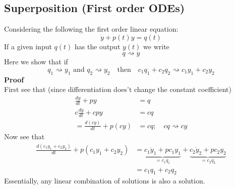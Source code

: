 \documentclass{report}
\begin{document}
\subsection{Superposition (First order ODEs)}%
Considering the following the first order linear equation:
\begin{equation*}
\dot{y}+p(t)y=q(t)
\end{equation*}
If a given input $q(t)$ has the output $y(t)$ we write
\begin{equation*}
q\rightsquigarrow y
\end{equation*}
Here we show that if
\begin{equation*}
q_1\rightsquigarrow y_1\text{ and }q_2\rightsquigarrow y_2
\quad\text{then}\quad c_1q_1+c_2q_2\rightsquigarrow
c_1y_1+c_2y_2
\end{equation*}
\textbf{Proof}\\
First see that (since differentiation does't change the constant coefficient)
\begin{align*}
\frac{dy}{dt}+py&=q\\
c\frac{dy}{dt}+cpy&=cq\\
=\frac{d(cy)}{dt}+p(cy)&=cq;\quad cq\rightsquigarrow cy
\end{align*}
Now see that
\begin{align*}
\frac{d(c_1y_1+c_2y_2)}{dt}+p(c_1y_1+c_2y_2)
&=\underbrace{c_1\dot{y}_1+pc_1y_1}_{=c_1q_1}
+\underbrace{c_2\dot{y}_2+pc_2y_2}_{=c_2q_2}\\
&=c_1q_1+c_2q_2
\end{align*}
Essentially, any linear combination of solutions is also a solution.
\newpage
\end{document}
